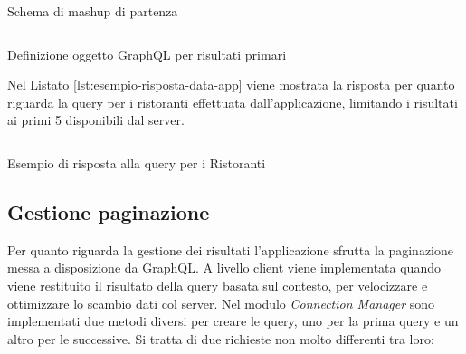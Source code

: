 \begin{listing}[H]
	\inputminted{json}{6-implementazione-app/Codice/mashup-schema-app.json}
	\caption{Schema di mashup di partenza}
	\label{lst:esempio-data-mashup}
\end{listing}

\begin{listing}[H]
	\inputminted{text}{6-implementazione-app/Codice/esempio-query-primary-app.txt}
	\caption{Definizione oggetto GraphQL per risultati primari}
	\label{lst:esempio-primary-app}
\end{listing}

Nel Listato \ref{lst:esempio-risposta-data-app} viene mostrata la risposta per quanto riguarda la query per i ristoranti effettuata dall'applicazione, limitando i risultati ai primi 5 disponibili dal server. 

\begin{listing}[H]
	\inputminted{json}{6-implementazione-app/Codice/esempio-risposta-data-app.json}
	\caption{Esempio di risposta alla query per i Ristoranti}
	\label{lst:esempio-risposta-data-app}
\end{listing}

\subsection{Gestione paginazione}\label{sec:paginazione-app}

Per quanto riguarda la gestione dei risultati l'applicazione sfrutta la paginazione messa a disposizione da GraphQL. A livello client viene implementata quando viene restituito il risultato della query basata sul contesto, per velocizzare e ottimizzare lo scambio dati col server. Nel modulo \emph{Connection Manager} sono implementati due metodi diversi per creare le query, uno per la prima query e un altro per le successive. Si tratta di due richieste non molto differenti tra loro:

